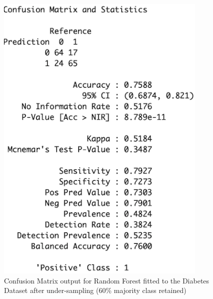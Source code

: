 \begin{figure}[!htbp]
\begin{minipage}{0.45\textwidth}
        \includegraphics[width=0.9\textwidth]{ThesisTemplate/appendix/images/Chapter5Appendix/ConfusionMatrix60/Diabetes.png}
        \caption{Confusion Matrix output for Random Forest fitted to the Diabetes Dataset after under-sampling (60\% majority class retained)}
        \label{fig:matrixDia60}
    \end{minipage}
\end{figure}


